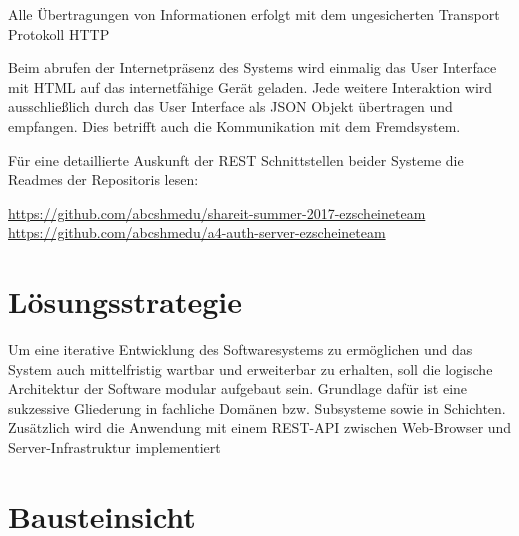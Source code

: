 \documentclass[]{report}
\begin{document}
Alle Übertragungen von Informationen erfolgt mit dem ungesicherten Transport Protokoll HTTP

Beim abrufen der Internetpräsenz des Systems wird einmalig das User Interface mit HTML auf das internetfähige Gerät geladen.
Jede weitere Interaktion wird ausschließlich durch das User Interface als JSON Objekt übertragen und empfangen.
Dies betrifft auch die Kommunikation mit dem Fremdsystem.

Für eine detaillierte Auskunft der REST Schnittstellen beider Systeme
die Readmes der Repositoris lesen:

\url{https://github.com/abcshmedu/shareit-summer-2017-ezscheineteam}\\
\url{https://github.com/abcshmedu/a4-auth-server-ezscheineteam}

\section{Lösungsstrategie}\label{section-solution-strategy}
Um eine iterative Entwicklung des Softwaresystems zu ermöglichen und das System auch mittelfristig wartbar und erweiterbar zu erhalten, soll die logische Architektur der Software modular aufgebaut sein. Grundlage dafür ist eine sukzessive Gliederung in fachliche Domänen bzw. Subsysteme  sowie in Schichten.
Zusätzlich wird die Anwendung mit einem REST-API zwischen Web-Browser und Server-Infrastruktur implementiert 

\section{Bausteinsicht}\label{section-building-block-view}
\end{document}
